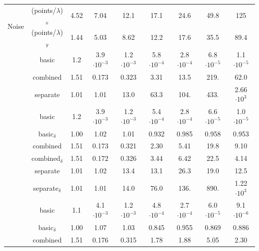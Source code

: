 \begin{table}[H]
\centering
    \begin{tabular}{|c|c|ccccccc|}
        \hline
        \multirow{2}{*}{Noise} & (points/$\lambda$)$_x$ & 4.52 & 7.04 & 12.1 & 17.1 & 24.6 & 49.8 & 125 \\
        & (points/$\lambda$)$_y$ & 1.44 & 5.03 & 8.62 & 12.2 & 17.6 & 35.5 & 89.4 \\
        \hline
        \hline
        \rowcolor[gray]{.9}
        \cellcolor{white}
        & basic & 1.2 & 3.9$\cdot 10^{-3}$ & 1.2$\cdot 10^{-3}$ & 5.8$\cdot 10^{-4}$ & 2.8$\cdot 10^{-4}$ & 6.8$\cdot 10^{-5}$ & 1.1$\cdot 10^{-5 }$ \\
        \cline{2-9}
        \cellcolor{white}
        & combined & 1.51 & 0.173 & 0.323 & 3.31 & 13.5 & 219. & 62.0 \\
        \cellcolor{white}
        \multirow{-3}{*}{0\%}
        & separate & 1.01 & 1.01 & 13.0 & 63.3 & 104. & 433. & 2.66$\cdot 10^3$ \\
        \hline
        \hline
        \rowcolor[gray]{.9}
        \cellcolor{white}
        & basic & 1.2 & 3.9$\cdot 10^{-3}$ & 1.2$\cdot 10^{-3}$ & 5.4$\cdot 10^{-4}$ & 2.8$\cdot 10^{-4}$ & 6.6$\cdot 10^{-5}$ & 1.0$\cdot 10^{-5 }$ \\
        \cline{2-9}
        \cellcolor{white}
        & basic$_\delta$ & 1.00 & 1.02 & 1.01 & 0.932 & 0.985 & 0.958 & 0.953 \\
        \cellcolor{white}
        & combined & 1.51 & 0.173 & 0.321 & 2.30 & 5.41 & 19.8 & 9.10 \\
        \cellcolor{white}
        & combined$_\delta$ & 1.51 & 0.172 & 0.326 & 3.44 & 6.42 & 22.5 & 4.14 \\
        \cellcolor{white}
        & separate & 1.01 & 1.02 & 13.4 & 13.1 & 26.3 & 19.0 & 12.5 \\
        \cellcolor{white}
        \multirow{-6}{*}{0.05\%}
        & separate$_\delta$ & 1.01 & 1.01 & 14.0 & 76.0 & 136. & 890. & 1.22$\cdot 10^3$ \\
        \hline
        \hline
        \rowcolor[gray]{.9}
        \cellcolor{white}
        & basic & 1.1 & 4.1$\cdot 10^{-3}$ & 1.2$\cdot 10^{-3}$ & 4.8$\cdot 10^{-4}$ & 2.7$\cdot 10^{-4}$ & 6.0$\cdot 10 ^{-5}$ & 9.1$\cdot 10^{-6 }$ \\
        \cline{2-9}
        \cellcolor{white}
        & basic$_\delta$ & 1.00 & 1.07 & 1.03 & 0.845 & 0.955 & 0.869 & 0.886 \\
        \cellcolor{white}
        & combined & 1.51 & 0.176 & 0.315 & 1.78 & 1.88 & 5.05 & 2.30 \\

\end{tabular}
\end{table}

